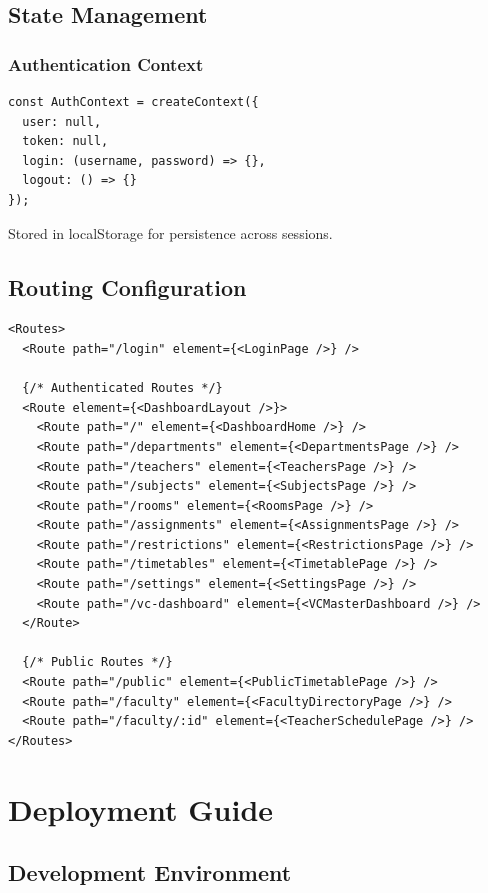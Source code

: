 \documentclass[12pt,a4paper]{article}
\begin{document}
\subsection{State Management}

\subsubsection{Authentication Context}
\begin{verbatim}
const AuthContext = createContext({
  user: null,
  token: null,
  login: (username, password) => {},
  logout: () => {}
});
\end{verbatim}

Stored in localStorage for persistence across sessions.


\subsection{Routing Configuration}

\begin{verbatim}
<Routes>
  <Route path="/login" element={<LoginPage />} />
  
  {/* Authenticated Routes */}
  <Route element={<DashboardLayout />}>
    <Route path="/" element={<DashboardHome />} />
    <Route path="/departments" element={<DepartmentsPage />} />
    <Route path="/teachers" element={<TeachersPage />} />
    <Route path="/subjects" element={<SubjectsPage />} />
    <Route path="/rooms" element={<RoomsPage />} />
    <Route path="/assignments" element={<AssignmentsPage />} />
    <Route path="/restrictions" element={<RestrictionsPage />} />
    <Route path="/timetables" element={<TimetablePage />} />
    <Route path="/settings" element={<SettingsPage />} />
    <Route path="/vc-dashboard" element={<VCMasterDashboard />} />
  </Route>
  
  {/* Public Routes */}
  <Route path="/public" element={<PublicTimetablePage />} />
  <Route path="/faculty" element={<FacultyDirectoryPage />} />
  <Route path="/faculty/:id" element={<TeacherSchedulePage />} />
</Routes>
\end{verbatim}

\section{Deployment Guide}

\subsection{Development Environment}
\end{document}
